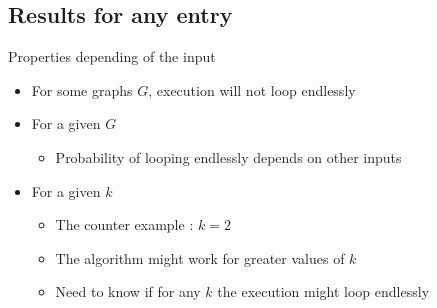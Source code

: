 \subsection{Results for any entry}
\begin{frame}{Properties depending of the input}
  \begin{itemize}
  \item For some graphs $G$, execution will not loop endlessly
  \item For a given $G$
    \begin{itemize}
    \item Probability of looping endlessly depends on other inputs
    \end{itemize}
  \item For a given $k$
    \begin{itemize}
    \item The counter example : $k = 2$
    \item The algorithm might work for greater values of $k$
    \item Need to know if for any $k$ the execution might loop endlessly
    \end{itemize}
  \end{itemize}
\end{frame}



